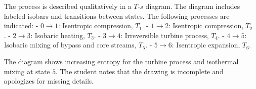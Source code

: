 The process is described qualitatively in a \( T \)-\( s \) diagram. The diagram includes labeled isobars and transitions between states. The following processes are indicated:  
- \( 0 \to 1 \): Isentropic compression, \( T_1 \).  
- \( 1 \to 2 \): Isentropic compression, \( T_2 \).  
- \( 2 \to 3 \): Isobaric heating, \( T_3 \).  
- \( 3 \to 4 \): Irreversible turbine process, \( T_4 \).  
- \( 4 \to 5 \): Isobaric mixing of bypass and core streams, \( T_5 \).  
- \( 5 \to 6 \): Isentropic expansion, \( T_6 \).  

The diagram shows increasing entropy for the turbine process and isothermal mixing at state \( 5 \). The student notes that the drawing is incomplete and apologizes for missing details.